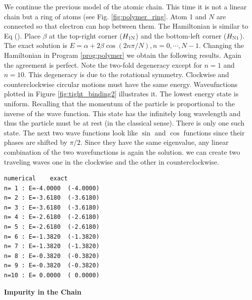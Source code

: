 {\medskip
\noindent
We continue the previous model of the atomic chain.  This time it is not a linear chain but a ring of atoms (see Fig. \ref{fig:polymer_ring}.  Atom 1 and $N$ are connected so that electron can hop between them. The Hamiltonian is similar to Eq ().  Place $\beta$ at the top-right corner ($H_\textsc{1N}$) and the bottom-left corner ($H_\textsc{N1}$).  The exact solution is $E = \alpha + 2 \beta \cos(2 n \pi/N), n=0, \cdots, N-1$.\cite{tight_binding}  Changing the Hamiltonian in Program \ref{prog:polymer} we obtain the following results.  Again the agreement is perfect.  Note the two-fold degeneracy except for $n=1$ and $n=10$.   This degeneracy is due to the rotational symmetry.  Clockwise and counterclockwise circular motions must have the same energy.  Waveufnctions plotted in  Figure \ref{fig:tight_binding2} illustrates it. The lowest energy state is uniform.  Recalling that the momentum of the particle is proportional to the inverse of the wave function. This state has the infinitely long wavelength and thus the particle must be at rest (in the classical sense).  There is only one such state.  The next two wave functions look like $\sin$ and $\cos$ functions since their phases are shifted by $\pi/2$.  Since they have the same eigenvalue, any linear combination of the two wavefunctions is again the solution.  we can create two traveling waves one in the clockwise and the other in counterclockwise.

\begin{center}
\begin{minipage}{3in}
\small
\begin{Verbatim}[frame=single]
       numerical    exact
n= 1 : E=-4.0000  (-4.0000)
n= 2 : E=-3.6180  (-3.6180)
n= 3 : E=-3.6180  (-3.6180)
n= 4 : E=-2.6180  (-2.6180)
n= 5 : E=-2.6180  (-2.6180)
n= 6 : E=-1.3820  (-1.3820)
n= 7 : E=-1.3820  (-1.3820)
n= 8 : E=-0.3820  (-0.3820)
n= 9 : E=-0.3820  (-0.3820)
n=10 : E= 0.0000  ( 0.0000)
\end{Verbatim}
\normalsize
\end{minipage}
\end{center}

\bigskip
\noindent
\textbf{Impurity in the Chain}

}
